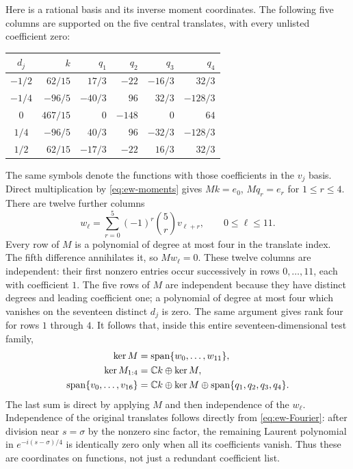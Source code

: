 Here is a rational basis and its inverse moment coordinates. The following
five columns are supported on the five central translates, with every
unlisted coefficient zero:
\begin{center}\small
\begin{tabular}{c|rrrrr}
$d_j$ & $k$ & $q_1$ & $q_2$ & $q_3$ & $q_4$\\\hline
$-1/2$ & $62/15$ & $17/3$ & $-22$ & $-16/3$ & $32/3$\\
$-1/4$ & $-96/5$ & $-40/3$ & $96$ & $32/3$ & $-128/3$\\
$0$ & $467/15$ & $0$ & $-148$ & $0$ & $64$\\
$1/4$ & $-96/5$ & $40/3$ & $96$ & $-32/3$ & $-128/3$\\
$1/2$ & $62/15$ & $-17/3$ & $-22$ & $16/3$ & $32/3$
\end{tabular}
\end{center}
The same symbols denote the functions with those coefficients in the
$v_j$ basis. Direct multiplication by \eqref{eq:ew-moments} gives
$Mk=e_0$, $Mq_r=e_r$ for $1\le r\le4$.
There are twelve further columns
\begin{equation}
 w_\ell=\sum_{r=0}^{5}(-1)^r\binom5r v_{\ell+r},\qquad 0\le\ell\le11.
 \label{eq:ew-differences}
\end{equation}
Every row of $M$ is a polynomial of degree at most four in the translate
index. The fifth difference annihilates it, so $Mw_\ell=0$.
These twelve columns are independent: their first nonzero entries occur
successively in rows $0,\ldots,11$, each with coefficient $1$.
The five rows of $M$ are independent because they have distinct degrees
and leading coefficient one; a polynomial of degree at most four which
vanishes on the seventeen distinct $d_j$ is zero. The same argument gives
rank four for rows $1$ through $4$.
It follows that, inside this entire seventeen-dimensional test family,
\begin{align}
 \ker M&=\operatorname{span}\{w_0,\ldots,w_{11}\},\notag\\
 \ker M_{1:4}&=\mathbb C k\oplus\ker M,\notag\\
 \operatorname{span}\{v_0,\ldots,v_{16}\}
  &=\mathbb C k\oplus\ker M\oplus
                     \operatorname{span}\{q_1,q_2,q_3,q_4\}.
 \label{eq:ew-full-basis}
\end{align}
The last sum is direct by applying $M$ and then independence of the
$w_\ell$. Independence of the original translates follows directly from
\eqref{eq:ew-Fourier}: after division near $s=\sigma$ by the nonzero sinc
factor, the remaining Laurent polynomial in $e^{-i(s-\sigma)/4}$ is identically
zero only when all its coefficients vanish. Thus these are coordinates
on functions, not just a redundant coefficient list.

